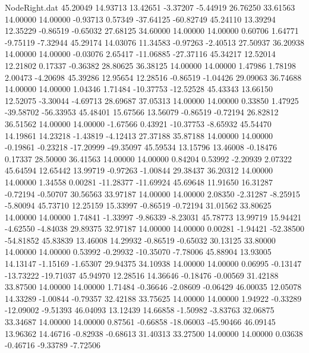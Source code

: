 \begin{filecontents}{NodeRight.dat}
  45.20049   14.93713   13.42651    -3.37207   -5.44919   26.76250   33.61563   14.00000   14.00000   -0.93713    0.57349  -37.64125  -60.82749
  45.24110   13.39294   12.35229    -0.86519   -0.65032   27.68125   34.60000   14.00000   14.00000    0.60706    1.64771   -9.75119   -7.32944
  45.29174   14.03076   11.34583    -0.97263   -2.40513   27.50937   36.20938   14.00000   14.00000   -0.03076    2.65417  -11.06885  -27.37116
  45.34217   12.52014   12.21802     0.17337   -0.36382   28.80625   36.38125   14.00000   14.00000    1.47986    1.78198    2.00473   -4.20698
  45.39286   12.95654   12.28516    -0.86519   -1.04426   29.09063   36.74688   14.00000   14.00000    1.04346    1.71484  -10.37753  -12.52528
  45.43343   13.66150   12.52075    -3.30044   -4.69713   28.69687   37.05313   14.00000   14.00000    0.33850    1.47925  -39.58702  -56.33953
  45.48401   15.67566   13.56079    -0.86519   -0.72194   26.82812   36.51562   14.00000   14.00000   -1.67566    0.43921  -10.37753   -8.65932
  45.54470   14.19861   14.23218    -1.43819   -4.12413   27.37188   35.87188   14.00000   14.00000   -0.19861   -0.23218  -17.20999  -49.35097
  45.59534   13.15796   13.46008    -0.18476    0.17337   28.50000   36.41563   14.00000   14.00000    0.84204    0.53992   -2.20939    2.07322
  45.64594   12.65442   13.99719    -0.97263   -1.00844   29.38437   36.20312   14.00000   14.00000    1.34558    0.00281  -11.28377  -11.69924
  45.69648   11.91650   16.31287    -0.72194   -0.50707   30.56563   33.97187   14.00000   14.00000    2.08350   -2.31287   -8.25915   -5.80094
  45.73710   12.25159   15.33997    -0.86519   -0.72194   31.01562   33.80625   14.00000   14.00000    1.74841   -1.33997   -9.86339   -8.23031
  45.78773   13.99719   15.94421    -4.62550   -4.84038   29.89375   32.97187   14.00000   14.00000    0.00281   -1.94421  -52.38500  -54.81852
  45.83839   13.46008   14.29932    -0.86519   -0.65032   30.13125   33.80000   14.00000   14.00000    0.53992   -0.29932  -10.35070   -7.78006
  45.88904   13.93005   14.13147    -1.15169   -1.65307   29.94375   34.10938   14.00000   14.00000    0.06995   -0.13147  -13.73222  -19.71037
  45.94970   12.28516   14.36646    -0.18476   -0.00569   31.42188   33.87500   14.00000   14.00000    1.71484   -0.36646   -2.08609   -0.06429
  46.00035   12.05078   14.33289    -1.00844   -0.79357   32.42188   33.75625   14.00000   14.00000    1.94922   -0.33289  -12.09002   -9.51393
  46.04093   13.12439   14.66858    -1.50982   -3.83763   32.06875   33.34687   14.00000   14.00000    0.87561   -0.66858  -18.06003  -45.90466
  46.09145   13.96362   14.46716    -0.82938   -0.68613   31.40313   33.27500   14.00000   14.00000    0.03638   -0.46716   -9.33789   -7.72506

\end{filecontents}
